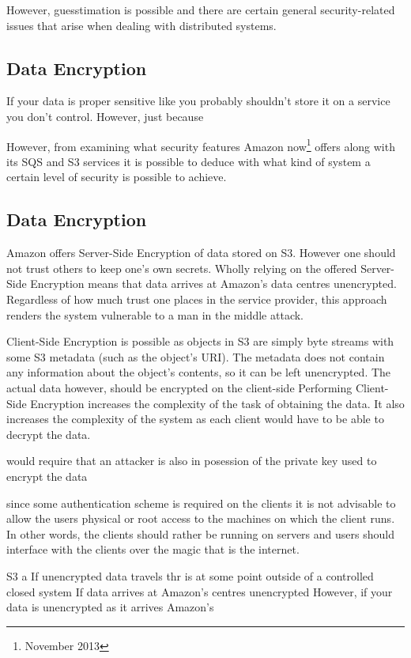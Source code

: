 \documentclass[11pt]{article}
\begin{document}
However, guesstimation is possible and there are certain general security-related issues that arise when dealing with distributed systems.

\subsection{Data Encryption}
If your data is proper sensitive like you probably shouldn't store it on a service you don't control.
However, just because 

However, from examining what security features Amazon now\footnote{November 2013} offers along with its SQS and S3 services it is possible to deduce with what kind of system a certain level of security is possible to achieve.



\subsection{Data Encryption}
Amazon offers Server-Side Encryption of data stored on S3.
However one should not trust others to keep one's own secrets.
Wholly relying on the offered Server-Side Encryption means that data arrives at Amazon's data centres unencrypted.
Regardless of how much trust one places in the service provider, this approach renders the system vulnerable to a man in the middle attack. 

Client-Side Encryption is possible as objects in S3 are simply byte streams with some S3 metadata (such as the object's URI).
The metadata does not contain any information about the object's contents, so it can be left unencrypted.
The actual data however, should be encrypted on the client-side 
Performing Client-Side Encryption increases the complexity of the task of obtaining the data.
It also increases the complexity of the system as each client would have to be able to decrypt the data.


would require that an attacker is also in posession of the private key used to encrypt the data 

since some authentication scheme is required on the clients it is not advisable to allow the users physical or root access to the machines on which the client runs. In other words, the clients should rather be running on servers and users should interface with the clients over the magic that is the internet.

S3 a
If unencrypted data travels thr
is at some point outside of a controlled closed system 
If data arrives at Amazon's centres unencrypted 
However, if your data is unencrypted as it arrives Amazon's 
\end{document}
